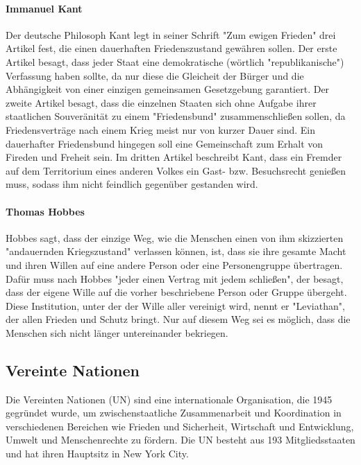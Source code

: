 \documentclass{article}
\begin{document}
	\paragraph{Immanuel Kant}
	Der deutsche Philosoph Kant legt in seiner Schrift "Zum ewigen Frieden" drei Artikel fest, die einen dauerhaften Friedenszustand gewähren sollen. Der erste Artikel besagt, dass jeder Staat eine demokratische (wörtlich "republikanische") Verfassung haben sollte, da nur diese die Gleicheit der Bürger und die Abhängigkeit von einer einzigen gemeinsamen Gesetzgebung garantiert.
	Der zweite Artikel besagt, dass die einzelnen Staaten sich ohne Aufgabe ihrer staatlichen Souveränität zu einem "Friedensbund" zusammenschließen sollen, da Friedensverträge nach einem Krieg meist nur von kurzer Dauer sind. Ein dauerhafter Friedensbund hingegen soll eine Gemeinschaft zum Erhalt von Fireden und Freheit sein.
	Im dritten Artikel beschreibt Kant, dass ein Fremder auf dem Territorium eines anderen Volkes ein Gast- bzw. Besuchsrecht genießen muss, sodass ihm nicht feindlich gegenüber gestanden wird.

	\paragraph{Thomas Hobbes}
	Hobbes sagt, dass der einzige Weg, wie die Menschen einen von ihm skizzierten "andauernden Kriegszustand" verlassen können, ist, dass sie ihre gesamte Macht und ihren Willen auf eine andere Person oder eine Personengruppe übertragen. Dafür muss nach Hobbes "jeder einen Vertrag mit jedem schließen", der besagt, dass der eigene Wille auf die vorher beschriebene Person oder Gruppe übergeht. Diese Institution, unter der der Wille aller vereinigt wird, nennt er "Leviathan", der allen Frieden und Schutz bringt. Nur auf diesem Weg sei es möglich, dass die Menschen sich nicht länger untereinander bekriegen.
 
	\subsection{Vereinte Nationen}
	Die Vereinten Nationen (UN) sind eine internationale Organisation, die 1945 gegründet wurde, um zwischenstaatliche Zusammenarbeit und Koordination in verschiedenen Bereichen wie Frieden und Sicherheit, Wirtschaft und Entwicklung, Umwelt und Menschenrechte zu fördern. Die UN besteht aus 193 Mitgliedsstaaten und hat ihren Hauptsitz in New York City.
\end{document}
